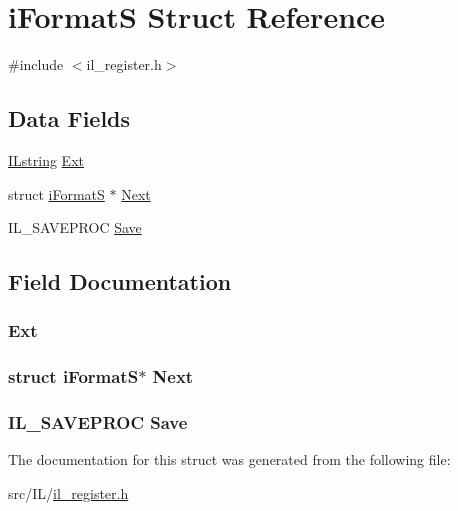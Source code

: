 \hypertarget{structi_format_s}{\section{i\-Format\-S Struct Reference}
\label{structi_format_s}
}


{\ttfamily \#include $<$il\-\_\-register.\-h$>$}

\subsection*{Data Fields}
\begin{DoxyCompactItemize}
\item 
\hyperlink{il_8h_a0e32959a190ae33935a98df16a7fdb5a}{I\-Lstring} \hyperlink{structi_format_s_a1b92ae18786b99897e88ed17afe1df37}{Ext}
\item 
struct \hyperlink{structi_format_s}{i\-Format\-S} $\ast$ \hyperlink{structi_format_s_a16067809efa48875735e5453ccbc42fe}{Next}
\item 
I\-L\-\_\-\-S\-A\-V\-E\-P\-R\-O\-C \hyperlink{structi_format_s_a4371acf3e9a0fcb1a701f4df94b1e7c4}{Save}
\end{DoxyCompactItemize}


\subsection{Field Documentation}
\hypertarget{structi_format_s_a1b92ae18786b99897e88ed17afe1df37}{
\subsubsection[{Ext}]{ Ext}}\label{structi_format_s_a1b92ae18786b99897e88ed17afe1df37}
\hypertarget{structi_format_s_a16067809efa48875735e5453ccbc42fe}{
\subsubsection[{Next}]{\setlength{\rightskip}{0pt plus 5cm}struct {\bf i\-Format\-S}$\ast$ Next}}\label{structi_format_s_a16067809efa48875735e5453ccbc42fe}
\hypertarget{structi_format_s_a4371acf3e9a0fcb1a701f4df94b1e7c4}{
\subsubsection[{Save}]{\setlength{\rightskip}{0pt plus 5cm}I\-L\-\_\-\-S\-A\-V\-E\-P\-R\-O\-C Save}}\label{structi_format_s_a4371acf3e9a0fcb1a701f4df94b1e7c4}


The documentation for this struct was generated from the following file\-:\begin{DoxyCompactItemize}
\item 
src/\-I\-L/\hyperlink{il__register_8h}{il\-\_\-register.\-h}\end{DoxyCompactItemize}
